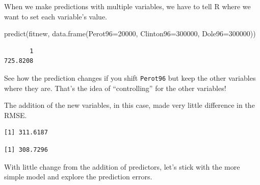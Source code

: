 \documentclass[
  letterpaper,
  DIV=11,
  numbers=noendperiod]{scrreprt}
\newenvironment{Shaded}{\begin{snugshade}}{\end{snugshade}}
\newcommand{\AttributeTok}[1]{\textcolor[rgb]{0.40,0.45,0.13}{#1}}
\newcommand{\DecValTok}[1]{\textcolor[rgb]{0.68,0.00,0.00}{#1}}
\newcommand{\FunctionTok}[1]{\textcolor[rgb]{0.28,0.35,0.67}{#1}}
\newcommand{\NormalTok}[1]{\textcolor[rgb]{0.00,0.23,0.31}{#1}}
\newcommand{\SpecialCharTok}[1]{\textcolor[rgb]{0.37,0.37,0.37}{#1}}
\begin{document}
When we make predictions with multiple variables, we have to tell R
where we want to set each variable's value.

\begin{Shaded}
\begin{Highlighting}[]
\FunctionTok{predict}\NormalTok{(fitnew, }\FunctionTok{data.frame}\NormalTok{(}\AttributeTok{Perot96=}\DecValTok{20000}\NormalTok{, }\AttributeTok{Clinton96=}\DecValTok{300000}\NormalTok{, }\AttributeTok{Dole96=}\DecValTok{300000}\NormalTok{))}
\end{Highlighting}
\end{Shaded}

\begin{verbatim}
       1 
725.8208 
\end{verbatim}

See how the prediction changes if you shift \texttt{Perot96} but keep
the other variables where they are. That's the idea of ``controlling''
for the other variables!

The addition of the new variables, in this case, made very little
difference in the RMSE.

\begin{Shaded}
\end{Shaded}

\begin{verbatim}
[1] 311.6187
\end{verbatim}

\begin{Shaded}
\end{Shaded}

\begin{verbatim}
[1] 308.7296
\end{verbatim}

With little change from the addition of predictors, let's stick with the
more simple model and explore the prediction errors.
\end{document}
